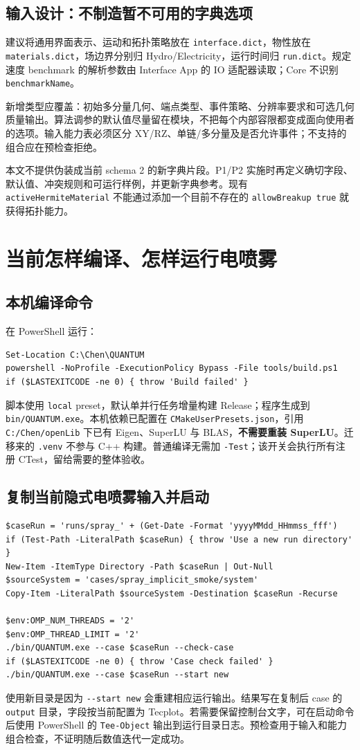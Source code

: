 \documentclass[11pt,a4paper]{article}
\newcommand{\code}[1]{{\small\nolinkurl{#1}}}
\begin{document}
\subsection{输入设计：不制造暂不可用的字典选项}
建议将通用界面表示、运动和拓扑策略放在 \code{interface.dict}，物性放在 \code{materials.dict}，场边界分别归 Hydro/Electricity，运行时间归 \code{run.dict}。规定速度 benchmark 的解析参数由 Interface App 的 IO 适配器读取；Core 不识别 \code{benchmarkName}。

新增类型应覆盖：初始多分量几何、端点类型、事件策略、分辨率要求和可选几何质量输出。算法调参的默认值尽量留在模块，不把每个内部容限都变成面向使用者的选项。输入能力表必须区分 XY/RZ、单链/多分量及是否允许事件；不支持的组合应在预检查拒绝。

本文不提供伪装成当前 schema 2 的新字典片段。P1/P2 实施时再定义确切字段、默认值、冲突规则和可运行样例，并更新字典参考。现有 \code{activeHermiteMaterial} 不能通过添加一个目前不存在的 \code{allowBreakup true} 就获得拓扑能力。

\clearpage
\section{当前怎样编译、怎样运行电喷雾}\label{sec:run}
\subsection{本机编译命令}
在 PowerShell 运行：
\begin{lstlisting}
Set-Location C:\Chen\QUANTUM
powershell -NoProfile -ExecutionPolicy Bypass -File tools/build.ps1
if ($LASTEXITCODE -ne 0) { throw 'Build failed' }
\end{lstlisting}
脚本使用 \code{local} preset，默认单并行任务增量构建 Release；程序生成到 \code{bin/QUANTUM.exe}。本机依赖已配置在 \code{CMakeUserPresets.json}，引用 \code{C:/Chen/openLib} 下已有 Eigen、SuperLU 与 BLAS，\textbf{不需要重装 SuperLU}。迁移来的 \code{.venv} 不参与 C++ 构建。普通编译无需加 \code{-Test}；该开关会执行所有注册 CTest，留给需要的整体验收。

\subsection{复制当前隐式电喷雾输入并启动}
\begin{lstlisting}
$caseRun = 'runs/spray_' + (Get-Date -Format 'yyyyMMdd_HHmmss_fff')
if (Test-Path -LiteralPath $caseRun) { throw 'Use a new run directory' }
New-Item -ItemType Directory -Path $caseRun | Out-Null
$sourceSystem = 'cases/spray_implicit_smoke/system'
Copy-Item -LiteralPath $sourceSystem -Destination $caseRun -Recurse

$env:OMP_NUM_THREADS = '2'
$env:OMP_THREAD_LIMIT = '2'
./bin/QUANTUM.exe --case $caseRun --check-case
if ($LASTEXITCODE -ne 0) { throw 'Case check failed' }
./bin/QUANTUM.exe --case $caseRun --start new
\end{lstlisting}
使用新目录是因为 \code{--start new} 会重建相应运行输出。结果写在复制后 case 的 \code{output} 目录，字段按当前配置为 Tecplot。若需要保留控制台文字，可在启动命令后使用 PowerShell 的 \code{Tee-Object} 输出到运行目录日志。预检查用于输入和能力组合检查，不证明随后数值迭代一定成功。
\end{document}
